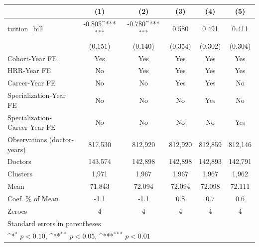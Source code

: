 {
\def\sym#1{\ifmmode^{#1}\else\(^{#1}\)\fi}
\begin{tabular}{l*{5}{c}}
\hline\hline
                    &\multicolumn{1}{c}{(1)}         &\multicolumn{1}{c}{(2)}         &\multicolumn{1}{c}{(3)}         &\multicolumn{1}{c}{(4)}         &\multicolumn{1}{c}{(5)}         \\
\hline
tuition\_bill        &      -0.805\sym{***}&      -0.780\sym{***}&       0.580         &       0.491         &       0.411         \\
                    &     (0.151)         &     (0.140)         &     (0.354)         &     (0.302)         &     (0.304)         \\
[1em]
Cohort-Year FE      &         Yes         &         Yes         &         Yes         &         Yes         &         Yes         \\
[1em]
HRR-Year FE         &          No         &         Yes         &         Yes         &         Yes         &         Yes         \\
[1em]
Career-Year FE      &          No         &          No         &         Yes         &         Yes         &          No         \\
[1em]
Specialization-Year FE&          No         &          No         &          No         &         Yes         &          No         \\
[1em]
Specialization-Career-Year FE&          No         &          No         &          No         &          No         &         Yes         \\
\hline
Observations (doctor-years)&     817,530         &     812,920         &     812,920         &     812,859         &     812,146         \\
Doctors             &     143,574         &     142,898         &     142,898         &     142,893         &     142,791         \\
Clusters            &       1,971         &       1,967         &       1,967         &       1,967         &       1,962         \\
Mean                &      71.843         &      72.094         &      72.094         &      72.098         &      72.111         \\
Coef. \% of Mean    &        -1.1         &        -1.1         &         0.8         &         0.7         &         0.6         \\
Zeroes              &           4         &           4         &           4         &           4         &           4         \\
\hline\hline
\multicolumn{6}{l}{\footnotesize Standard errors in parentheses}\\
\multicolumn{6}{l}{\footnotesize \sym{*} \(p<0.10\), \sym{**} \(p<0.05\), \sym{***} \(p<0.01\)}\\
\end{tabular}
}
